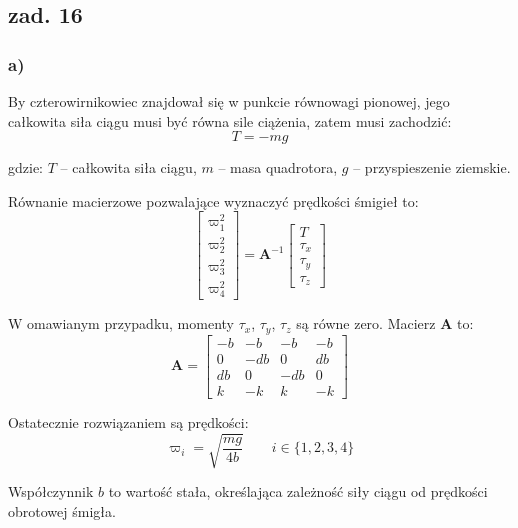 \documentclass[11pt, a4paper]{article}
\begin{document}
\subsection*{zad. 16}

\subsubsection*{a)}

By czterowirnikowiec znajdował się w punkcie równowagi pionowej, jego całkowita siła ciągu musi być równa sile ciążenia, zatem musi zachodzić:
\begin{equation*}
T = -mg
\end{equation*}

gdzie: $T$ -- całkowita siła ciągu, $m$ -- masa quadrotora, $g$ -- przyspieszenie ziemskie.

Równanie macierzowe pozwalające wyznaczyć prędkości śmigieł to:
\begin{equation*}
	\begin{bmatrix}
	\varpi_1^2 \\
	\varpi_2^2 \\
	\varpi_3^2 \\
	\varpi_4^2
	\end{bmatrix}
	=
	\mathbf{A}^{-1}
	\begin{bmatrix}
	T \\ \tau_x \\ \tau_y \\ \tau_z
	\end{bmatrix}
\end{equation*}

W omawianym przypadku, momenty $\tau_x$, $\tau_y$, $\tau_z$ są równe zero.
Macierz $\mathbf{A}$ to:
\begin{equation*}
\mathbf{A} =
	\begin{bmatrix}
	-b & -b & -b & -b \\
	0 & -db & 0 & db \\
	db & 0 & -db & 0 \\
	k & -k & k & -k
	\end{bmatrix}
\end{equation*}

Ostatecznie rozwiązaniem są prędkości:
\begin{equation*}
\varpi_i = \sqrt{\frac{mg}{4b}} \qquad i \in \{1, 2, 3, 4\}
\end{equation*}

Współczynnik $b$ to wartość stała, określająca zależność siły ciągu od prędkości obrotowej śmigła.
\end{document}
